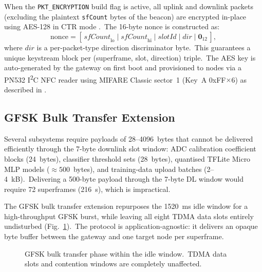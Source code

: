 \documentclass[conference]{IEEEtran}
\begin{document}
When the \texttt{PKT\_ENCRYPTION} build flag is active, all
uplink and downlink packets (excluding the plaintext \texttt{sfCount}
bytes of the beacon) are encrypted in-place using AES-128 in CTR mode
\cite{nist_sp800_38a}.\ The 16-byte nonce is constructed as:
\begin{equation}
  \text{nonce} = [\,\mathit{sfCount}_\text{lo} \mid
                    \mathit{sfCount}_\text{hi} \mid
                    \mathit{slotId} \mid
                    \mathit{dir} \mid
                    \mathbf{0}_{12}\,],
  \label{eq:nonce}
\end{equation}
where \(\mathit{dir}\) is a per-packet-type direction discriminator
byte.\ This guarantees a unique keystream block per (superframe,
slot, direction) triple.\ The AES key is auto-generated by the gateway
on first boot and provisioned to nodes via a PN532 I\textsuperscript{2}C
NFC reader using MIFARE Classic sector~1 (Key~A 0xFF$\times$6) as
described in \cite{hancke_rfid_security_2005}.

\subsection{GFSK Bulk Transfer Extension}
\label{ssec:gfsk}

Several subsystems require payloads of 28--4096~bytes that cannot be
delivered efficiently through the 7-byte downlink slot window: ADC
calibration coefficient blocks (24~bytes), classifier threshold sets
(28~bytes), quantised TFLite Micro MLP models (\(\approx 500\)~bytes),
and training-data upload batches (2--4~kB).\ Delivering a 500-byte
payload through the 7-byte DL window would require 72 superframes
(216~s), which is impractical.

The GFSK bulk transfer extension repurposes the 1520~ms idle window
for a high-throughput GFSK burst, while leaving all eight TDMA data
slots entirely undisturbed (Fig.\ \ref{fig:bulk}).\ The protocol is
application-agnostic: it delivers an opaque byte buffer between the
gateway and one target node per superframe.

\begin{figure}[t]
  \centering
  \caption{GFSK bulk transfer phase within the idle window.\ TDMA data
    slots and contention windows are completely unaffected.}
  \label{fig:bulk}
\end{figure}
\end{document}
